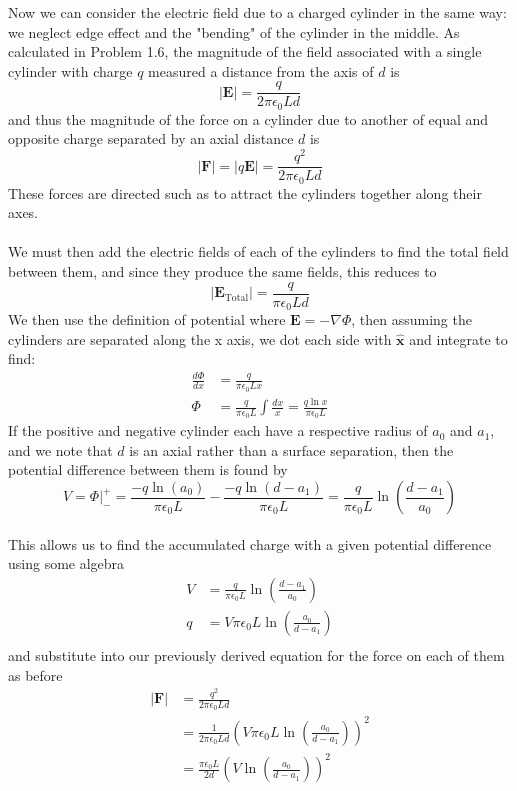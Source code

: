 \documentclass{article}
\begin{document}
Now we can consider the electric field due to a charged cylinder in the same way: we neglect edge effect and the "bending" of the cylinder in the middle. As calculated in Problem 1.6, the magnitude of the field associated with a single cylinder with charge $q$ measured a distance from the axis of $d$ is
\[ \left|\mathbf{E}\right| = \frac{q}{2\pi\epsilon_{0}Ld} \]
and thus the magnitude of the force on a cylinder due to another of equal and opposite charge separated by an axial distance $d$ is
\[ \left|\mathbf{F}\right| = \left|q\mathbf{E}\right| = \frac{q^{2}}{2\pi\epsilon_{0}Ld} \]
These forces are directed such as to attract the cylinders together along their axes.\\
\\
We must then add the electric fields of each of the cylinders to find the total field between them, and since they produce the same fields, this reduces to
\[ \left|\mathbf{E}_{\text{Total}}\right| = \frac{q}{\pi\epsilon_{0}Ld} \]
We then use the definition of potential where $\mathbf{E} = -\nabla\Phi$, then assuming the cylinders are separated along the x axis, we dot each side with $\mathbf{\hat{x}}$ and integrate to find:
\begin{align*}
\frac{d\Phi}{dx} &= \frac{q}{\pi\epsilon_{0}Lx}\\
\Phi &= \frac{q}{\pi\epsilon_{0}L} \int \frac{dx}{x} = \frac{q\ln x}{\pi\epsilon_{0}L}
\end{align*}
If the positive and negative cylinder each have a respective radius of $a_{0}$ and $a_{1}$, and we note that $d$ is an axial rather than a surface separation, then the potential difference between them is found by
\[ V = \Phi\rvert_{-}^{+} = \frac{-q\ln (a_{0})}{\pi\epsilon_{0}L} - \frac{-q\ln (d-{a_1})}{\pi\epsilon_{0}L} = \frac{q}{\pi\epsilon_{0}L}\ln\left(\frac{d-a_{1}}{a_{0}}\right) \]
\\
This allows us to find the accumulated charge with a given potential difference using some algebra
\begin{align*}
V &= \frac{q}{\pi\epsilon_{0}L}\ln\left(\frac{d-a_{1}}{a_{0}}\right)\\
q &= V\pi\epsilon_{0}L \ln\left(\frac{a_{0}}{d-a_{1}}\right)\\
\end{align*}
and substitute into our previously derived equation for the force on each of them as before
\begin{align*}
\left|\mathbf{F}\right| &= \frac{q^{2}}{2\pi\epsilon_{0}Ld}\\
&= \frac{1}{2\pi\epsilon_{0}Ld} \left( V\pi\epsilon_{0}L \ln\left(\frac{a_{0}}{d-a_{1}}\right) \right)^{2}\\
&= \boxed{\frac{\pi\epsilon_{0}L}{2d} \left( V \ln\left(\frac{a_{0}}{d-a_{1}}\right) \right)^{2}}
\end{align*}
\end{document}
